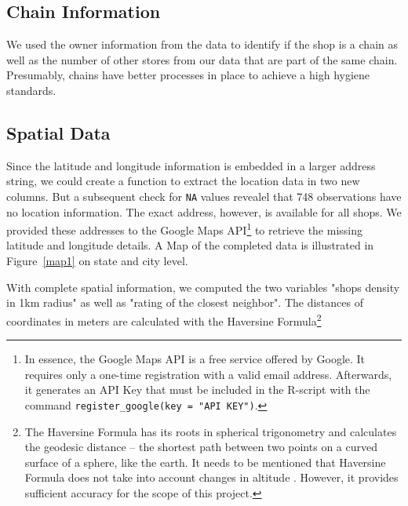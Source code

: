 \documentclass[11pt]{article}
\begin{document}
\subsection{Chain Information}

We used the owner information from the data to identify if the shop is a chain as well as the number of other stores from our data that are part of the same chain. Presumably, chains have better processes in place to achieve a high hygiene standards.

\subsection{Spatial Data}

Since the latitude and longitude information is embedded in a larger address string, we could create a function to extract the location data in two new columns. But a subsequent check for \texttt{NA} values revealel that 748 observations have no location information. The exact address, however, is available for all shops. We provided these addresses to the Google Maps API\footnote{In essence, the Google Maps API is a free service offered by Google. It requires only a one-time registration with a valid email address. Afterwards, it generates an API Key that must be included in the R-script  with the command \texttt{register\_google(key = "API KEY")}.} to retrieve the missing latitude and longitude details. A Map of the completed data is illustrated in Figure~\ref{map1} on state and city level.\\
\begin{figure}
     \hfill
\end{figure}
With complete spatial information, we computed the two variables "shops density in 1km radius" as well as "rating of the closest neighbor". The distances of coordinates in meters are calculated with the Haversine Formula\footnote{The Haversine Formula has its roots in spherical trigonometry and calculates the geodesic distance -- the shortest path between two points on a curved surface of a sphere, like the earth. It needs to be mentioned that Haversine Formula does not take into account changes in altitude \citep[pp. 157 - 160]{haversine}. However, it provides sufficient accuracy for the scope of this project.}
\end{document}
